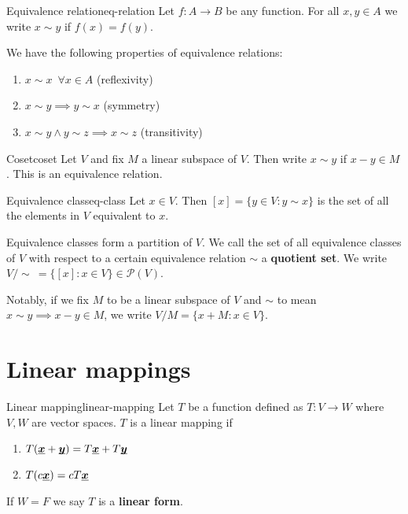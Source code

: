 \documentclass[12pt]{extarticle}
\renewcommand{\vec}[1]{\uvec{#1}}
\begin{document}
\begin{definition}{Equivalence relation}{eq-relation}
	Let $f:A \to B$ be any function. For all $x, y \in A$ we write $x \sim y$ if $f(x) = f(y)$.
\end{definition}

We have the following properties of equivalence relations:
\begin{enumerate}
	\item $x \sim x \enspace \forall x \in A$ (reflexivity)
	\item $x \sim y \implies y \sim x$ (symmetry)
	\item $x\sim y \land y\sim z \implies x \sim z$ (transitivity)
\end{enumerate}

\begin{example}{Coset}{coset}
	Let $V$ and fix $M$ a linear subspace of $V$. Then write $x \sim y$ if $x-y \in M$. This is an equivalence relation.
\end{example}

\begin{definition}{Equivalence class}{eq-class}
	Let $x \in V$. Then $[x] = \{y \in V: y \sim x\}$ is the set of all the elements in $V$ equivalent to $x$.
\end{definition}

Equivalence classes form a partition of $V$.
We call the set of all equivalence classes of $V$ with respect to a certain equivalence relation $\sim$ a \textbf{quotient set}.
We write $V/\sim \ = \{[x]: x \in V\} \in \mathscr P(V)$.

Notably, if we fix $M$ to be a linear subspace of $V$ and $\sim$ to mean $x \sim y \implies x - y \in M$, we write $V/M = \{ x + M : x \in V \}$.

\section{Linear mappings}

\begin{definition}{Linear mapping}{linear-mapping}
	Let $T$ be a function defined as $T: V \to W$ where $V, W$ are vector spaces.
	$T$ is a linear mapping if
	\begin{enumerate}
		\item $T(\vec x+\vec y) = T\vec x + T\vec y$
		\item $T(c\vec x) = cT\vec x$
	\end{enumerate}

	If $W = F$ we say $T$ is a \textbf{linear form}.
\end{definition}
\end{document}
